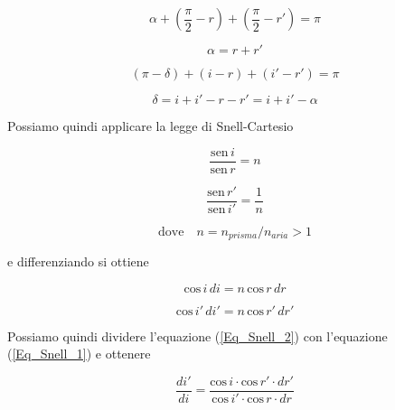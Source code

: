 \documentclass{article}
\begin{document}
\vspace{2mm}

\[\alpha + \left( \frac{\pi}{2} - r \right) +  \left(\frac{\pi}{2} - r' \right)=\pi\]

\begin{equation}
\alpha = r + r'
\label{alpha}
\end{equation}

\[(\pi - \delta) + (i - r) + (i' - r') = \pi\]

\begin{equation}
\delta = i + i' - r - r' = i + i' - \alpha
\label{delta}
\end{equation}

\vspace{2mm}

Possiamo quindi applicare la legge di Snell-Cartesio 

\vspace{1mm}

\begin{equation}
\frac{\textrm{sen}\, i}{\textrm{sen}\, r}=n
\end{equation}

\begin{equation}
\frac{\textrm{sen}\, r'}{\textrm{sen}\, i'}=\frac{1}{n} 
\end{equation}

\[\textrm{dove}\quad n=n_{prisma}/n_{aria}>1\]

e differenziando si ottiene

\begin{equation}
\textrm{cos}\, i \, di = n\, \textrm{cos}\, r \, dr
\label{Eq_Snell_1}
\end{equation}

\begin{equation}
\textrm{cos}\, i' \, di' = n\, \textrm{cos}\, r' \, dr'
\label{Eq_Snell_2}
\end{equation}

\vspace{2mm}

Possiamo quindi dividere l'equazione (\ref{Eq_Snell_2}) con l'equazione (\ref{Eq_Snell_1}) e ottenere

\vspace{1mm}

\begin{equation}
\frac{di'}{di}=\frac{\textrm{cos}\,i \cdot \textrm{cos}\, r' \cdot dr'}{\textrm{cos}\,i' \cdot \textrm{cos}\, r \cdot dr}
\label{Eq_Snell_3}
\end{equation}
\end{document}
